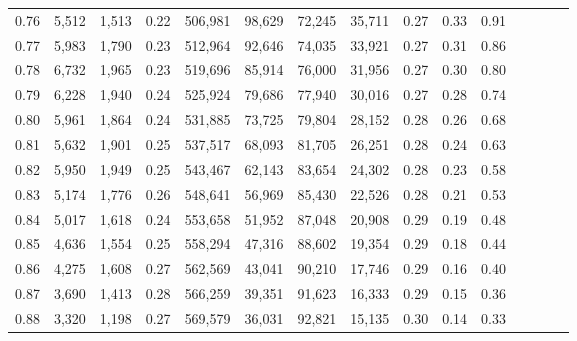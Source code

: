 \begin{tabular}{rrrcrrrrrrrrrrr}
0.76 &   5,512 &  1,513 &                                       0.22 &  506,981 &   98,629 &   72,245 &   35,711 &  0.27 &  0.33 &                         0.91 \\
0.77 &   5,983 &  1,790 &                                       0.23 &  512,964 &   92,646 &   74,035 &   33,921 &  0.27 &  0.31 &                         0.86 \\
0.78 &   6,732 &  1,965 &                                       0.23 &  519,696 &   85,914 &   76,000 &   31,956 &  0.27 &  0.30 &                         0.80 \\
0.79 &   6,228 &  1,940 &                                       0.24 &  525,924 &   79,686 &   77,940 &   30,016 &  0.27 &  0.28 &                         0.74 \\
0.80 &   5,961 &  1,864 &                                       0.24 &  531,885 &   73,725 &   79,804 &   28,152 &  0.28 &  0.26 &                         0.68 \\
0.81 &   5,632 &  1,901 &                                       0.25 &  537,517 &   68,093 &   81,705 &   26,251 &  0.28 &  0.24 &                         0.63 \\
0.82 &   5,950 &  1,949 &                                       0.25 &  543,467 &   62,143 &   83,654 &   24,302 &  0.28 &  0.23 &                         0.58 \\
0.83 &   5,174 &  1,776 &                                       0.26 &  548,641 &   56,969 &   85,430 &   22,526 &  0.28 &  0.21 &                         0.53 \\
0.84 &   5,017 &  1,618 &                                       0.24 &  553,658 &   51,952 &   87,048 &   20,908 &  0.29 &  0.19 &                         0.48 \\
0.85 &   4,636 &  1,554 &                                       0.25 &  558,294 &   47,316 &   88,602 &   19,354 &  0.29 &  0.18 &                         0.44 \\
0.86 &   4,275 &  1,608 &                                       0.27 &  562,569 &   43,041 &   90,210 &   17,746 &  0.29 &  0.16 &                         0.40 \\
0.87 &   3,690 &  1,413 &                                       0.28 &  566,259 &   39,351 &   91,623 &   16,333 &  0.29 &  0.15 &                         0.36 \\
0.88 &   3,320 &  1,198 &                                       0.27 &  569,579 &   36,031 &   92,821 &   15,135 &  0.30 &  0.14 &                         0.33 \\

\end{tabular}
